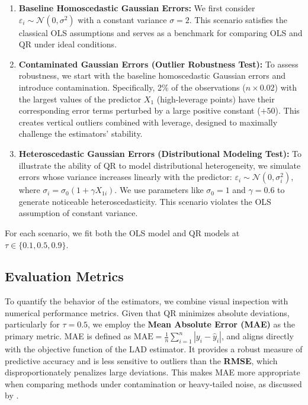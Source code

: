 \documentclass[fleqn,10pt]{latex/stylish_article} %
\begin{document}
\begin{enumerate}
\def\labelenumi{\arabic{enumi}.}
\item
  \textbf{Baseline Homoscedastic Gaussian Errors:} We first consider \(\varepsilon_i \sim \mathcal{N}(0, \sigma^2)\) with a constant variance \(\sigma = 2\). This scenario satisfies the classical OLS assumptions and serves as a benchmark for comparing OLS and QR under ideal conditions.
\item
  \textbf{Contaminated Gaussian Errors (Outlier Robustness Test):} To assess robustness, we start with the baseline homoscedastic Gaussian errors and introduce contamination. Specifically, 2\% of the observations (\(n \times 0.02\)) with the largest values of the predictor \(X_1\) (high-leverage points) have their corresponding error terms perturbed by a large positive constant (\(+50\)). This creates vertical outliers combined with leverage, designed to maximally challenge the estimators' stability.
\item
  \textbf{Heteroscedastic Gaussian Errors (Distributional Modeling Test):} To illustrate the ability of QR to model distributional heterogeneity, we simulate errors whose variance increases linearly with the predictor: \(\varepsilon_i \sim \mathcal{N}(0, \sigma_i^2)\), where \(\sigma_i = \sigma_0 (1 + \gamma X_{1i})\). We use parameters like \(\sigma_0 = 1\) and \(\gamma = 0.6\) to generate noticeable heteroscedasticity. This scenario violates the OLS assumption of constant variance.
\end{enumerate}

For each scenario, we fit both the OLS model and QR models at \(\tau \in \{0.1, 0.5, 0.9\}\).

\subsection{Evaluation Metrics}\label{evaluation-metrics}

To quantify the behavior of the estimators, we combine visual inspection with numerical performance metrics. Given that QR minimizes absolute deviations, particularly for \(\tau = 0.5\), we employ the \textbf{Mean Absolute Error (MAE)} as the primary metric. MAE is defined as \(\text{MAE} = \frac{1}{n} \sum_{i=1}^n |y_i - \hat{y}_i|\), and aligns directly with the objective function of the LAD estimator. It provides a robust measure of predictive accuracy and is less sensitive to outliers than the \textbf{RMSE}, which disproportionately penalizes large deviations. This makes MAE more appropriate when comparing methods under contamination or heavy-tailed noise, as discussed by \citet{Koenker2005}.
\end{document}
